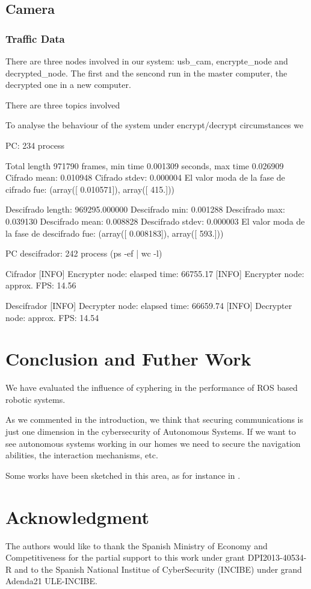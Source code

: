 \documentclass[journal,twoside]{JoPhA}
\begin{document}
\subsection{Camera}

\subsubsection{Traffic Data}

There are three nodes involved in our system: usb\_cam, encrypte\_node and decrypted\_node. The first and the sencond run in the master computer, the decrypted one in a new computer.

There are three topics involved 

To analyse the behaviour of the system under encrypt/decrypt circumstances we 

PC: 234 process

Total length 971790 frames, min time 0.001309 seconds, max time  0.026909
Cifrado mean: 0.010948
Cifrado stdev: 0.000004
El valor moda de la fase de cifrado fue:
(array([ 0.010571]), array([ 415.]))

Descifrado length: 969295.000000
Descifrado min: 0.001288
Descifrado max: 0.039130
Descifrado mean: 0.008828
Descifrado stdev: 0.000003
El valor moda de la fase de descifrado fue:
(array([ 0.008183]), array([ 593.]))


PC descifrador: 242 process (ps -ef | wc -l)

Cifrador
[INFO] Encrypter node:  elasped time: 66755.17
[INFO] Encrypter node:  approx. FPS: 14.56



Descifrador
[INFO] Decrypter node: elapsed time: 66659.74
[INFO] Decrypter node: approx. FPS: 14.54





\section{Conclusion and Futher Work}

We have evaluated the influence of cyphering in the performance of ROS based robotic systems.

As we commented in the introduction, we think that securing communications is just one dimension in  the cybersecurity of Autonomous Systems. If we want to see autonomous systems working in our homes we need to secure the navigation abilities, the interaction mechanisms, etc. 
 
Some works have been sketched in this area, as for instance in \cite{Guiochet2016}.




\section*{Acknowledgment}
The authors would  like to thank the Spanish Ministry of Economy and Competitiveness for the partial support to this work under grant DPI2013-40534-R and to the Spanish National Institue of CyberSecurity (INCIBE) under grand Adenda21 ULE-INCIBE.

 

\end{document}

